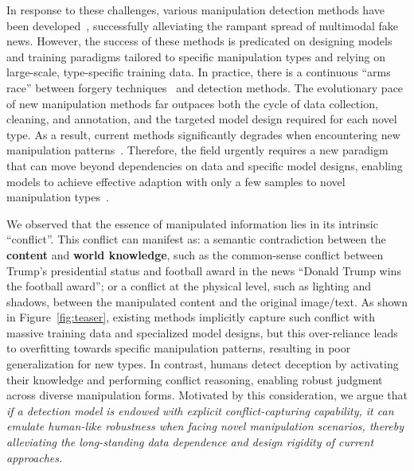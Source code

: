 \documentclass{article}
\theoremstyle{plain}
\theoremstyle{definition}
\theoremstyle{remark}
\begin{document}
In response to these challenges, various manipulation detection methods have been developed~\cite{dgm4,samm,mdsm,fka-owl,hammer++,clc}, successfully alleviating the rampant spread of multimodal fake news. However, the success of these methods is predicated on designing models and training paradigms tailored to specific manipulation types and relying on large-scale, type-specific training data. In practice, there is a continuous ``arms race'' between forgery techniques~\cite{simswap,hfgi,styleclip,infoswap} and detection methods. The evolutionary pace of new manipulation methods far outpaces both the cycle of data collection, cleaning, and annotation, and the targeted model design required for each novel type. As a result, current methods significantly degrades when encountering new manipulation patterns~\cite{yaxiongAIGCDet1,yaxiongAIGCDet2,yaxiongAIGCDet3}. 
Therefore, the field urgently requires a new paradigm that can move beyond dependencies on data and specific model designs, enabling models to achieve effective adaption with only a few samples to novel manipulation types~\cite{intro11,intro12,intro13}.

We observed that the essence of manipulated information lies in its intrinsic ``conflict''. This conflict can manifest as: a semantic contradiction between the \textbf{content} and \textbf{world knowledge}, such as the common-sense conflict between Trump's presidential status and football award in the news ``Donald Trump wins the football award''; 
or a conflict at the physical level, such as lighting and shadows, between the manipulated content and the original image/text. As shown in Figure~\ref{fig:teaser}, existing methods implicitly capture such conflict with massive training data and specialized model designs, but this over-reliance leads to overfitting towards specific manipulation patterns, resulting in poor generalization for new types. In contrast, humans detect deception by activating their knowledge and performing conflict reasoning, enabling robust judgment across diverse manipulation forms. Motivated by this consideration, we argue that \textit{if a detection model is endowed with explicit conflict-capturing capability, it can emulate human-like robustness when facing novel manipulation scenarios, thereby alleviating the long-standing data dependence and design rigidity of current approaches.}
\end{document}
